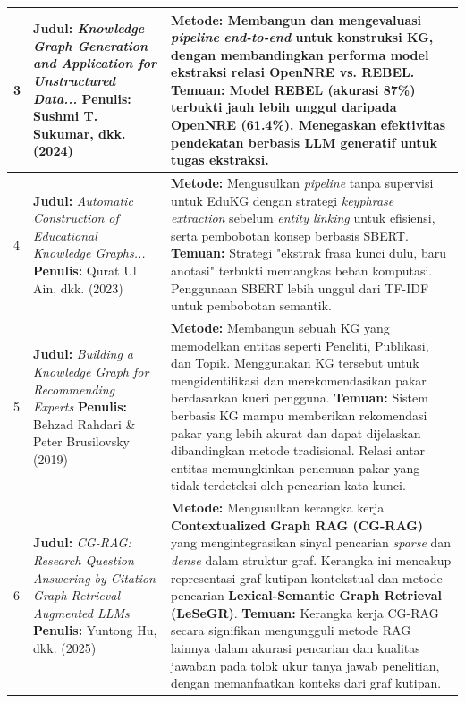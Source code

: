\begin{longtable}{|p{0.5cm}|p{4cm}|p{5cm}|}
	3 & 
	\textbf{Judul:} \textit{Knowledge Graph Generation and Application for Unstructured Data...} \newline
	\textbf{Penulis:} Sushmi T. Sukumar, dkk. (2024) \cite{thushara2024} &
	\textbf{Metode:} Membangun dan mengevaluasi \textit{pipeline} \textit{end-to-end} untuk konstruksi KG, dengan membandingkan performa model ekstraksi relasi OpenNRE vs. REBEL. \newline
	\textbf{Temuan:} Model REBEL (akurasi 87\%) terbukti jauh lebih unggul daripada OpenNRE (61.4\%). Menegaskan efektivitas pendekatan berbasis LLM generatif untuk tugas ekstraksi. \\
	\hline
	
	4 & 
	\textbf{Judul:} \textit{Automatic Construction of Educational Knowledge Graphs...} \newline
	\textbf{Penulis:} Qurat Ul Ain, dkk. (2023) \cite{Ain2023AutomaticCO} &
	\textbf{Metode:} Mengusulkan \textit{pipeline} tanpa supervisi untuk EduKG dengan strategi \textit{keyphrase extraction} sebelum \textit{entity linking} untuk efisiensi, serta pembobotan konsep berbasis SBERT. \newline
	\textbf{Temuan:} Strategi "ekstrak frasa kunci dulu, baru anotasi" terbukti memangkas beban komputasi. Penggunaan SBERT lebih unggul dari TF-IDF untuk pembobotan semantik. \\
	\hline
	
	5 & 
	\textbf{Judul:} \textit{Building a Knowledge Graph for Recommending Experts} \newline
	\textbf{Penulis:} Behzad Rahdari \& Peter Brusilovsky (2019) &
	\textbf{Metode:} Membangun sebuah KG yang memodelkan entitas seperti Peneliti, Publikasi, dan Topik. Menggunakan KG tersebut untuk mengidentifikasi dan merekomendasikan pakar berdasarkan kueri pengguna. \newline
	\textbf{Temuan:} Sistem berbasis KG mampu memberikan rekomendasi pakar yang lebih akurat dan dapat dijelaskan dibandingkan metode tradisional. Relasi antar entitas memungkinkan penemuan pakar yang tidak terdeteksi oleh pencarian kata kunci. \\
	\hline
	
	6 & 
	\textbf{Judul:} \textit{CG-RAG: Research Question Answering by Citation Graph Retrieval-Augmented LLMs} \newline
	\textbf{Penulis:} Yuntong Hu, dkk. (2025) \cite{hu2025cgragresearchquestionanswering} &
	\textbf{Metode:} Mengusulkan kerangka kerja \textbf{Contextualized Graph RAG (CG-RAG)} yang mengintegrasikan sinyal pencarian \textit{sparse} dan \textit{dense} dalam struktur graf. Kerangka ini mencakup representasi graf kutipan kontekstual dan metode pencarian \textbf{Lexical-Semantic Graph Retrieval (LeSeGR)}. \newline
	\textbf{Temuan:} Kerangka kerja CG-RAG secara signifikan mengungguli metode RAG lainnya dalam akurasi pencarian dan kualitas jawaban pada tolok ukur tanya jawab penelitian, dengan memanfaatkan konteks dari graf kutipan. \\
	\hline


\end{longtable}

